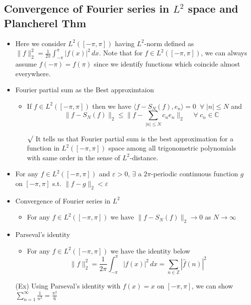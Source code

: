 \documentclass[12pt]{article}
\newcommand{\rmk}{$\surd$}
\newcommand{\forany}{\; \forall \;}
\begin{document}
\subsection{Convergence of Fourier series in $L^2$ space and Plancherel Thm}
\smallskip
\begin{itemize}
    \item Here we consider $L^2([-\pi, \pi])$ having $L^2$-norm defined as $\|f\|_2^2=\frac{1}{2\pi}\int_{-\pi}^\pi |f(x)|^2\, dx$. Note that for $f\in L^2([-\pi, \pi])$, we can always assume $f(-\pi)=f(\pi)$ since we identify functions which coincide almost everywhere.
    \item Fourier partial sum as the Best approximtaion
    \begin{itemize}
        \item If $f\in L^2([-\pi, \pi])$ then we have $\langle f-S_N(f), e_n \rangle=0 \; \forany |n|\leq N$ and \begin{equation*}  \quad 
            \|f-S_N(f)\|_2\leq \bigg\|f-\sum_{|n|\leq N}c_ne_n\bigg\|_2 \quad \forany c_n\in \mathbb{C}
        \end{equation*}
        \item[\rmk] It tells us that Fourier partial sum is the best approximation for a function in $L^2([-\pi, \pi])$ space among all trigonometric polynomials with same order in the sense of $L^2$-distance.
    \end{itemize} 
    \item For any $f\in L^2([-\pi, \pi])$ and $\varepsilon>0$, $\exists$ a $2\pi$-periodic continuous function $g$ on $[-\pi, \pi]$ s.t. $\|f-g\|_2<\varepsilon$
    \item Convergence of Fourier series in $L^2$
    \begin{itemize}
        \item For any $f\in L^2([-\pi, \pi])$ we have $\|f-S_N(f)\|_2\rightarrow 0$ as $N\rightarrow \infty$
    \end{itemize}
    \item Parseval's identity
    \begin{itemize}
        \item For any $f\in L^2([-\pi, \pi])$ we have the identity below \begin{equation*}
            \|f\|_2^2=\frac{1}{2\pi}\int_{-\pi}^\pi |f(x)|^2\, dx=\sum_{n\in \mathbb{Z}}|\hat{f}(n)|^2
        \end{equation*}
    \end{itemize}
    \item[(Ex)] Using Parseval's identity with $f(x)=x$ on $[-\pi, \pi]$, we can show $\sum_{n=1}^\infty \frac{1}{n^2}=\frac{\pi^2}{6}$

\end{itemize}
\end{document}
